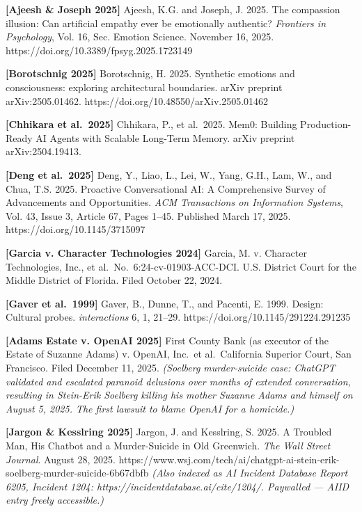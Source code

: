 \documentclass[12pt]{article}
\begin{document}
\textbf{{[}Ajeesh \& Joseph 2025{]}} Ajeesh, K.G. and Joseph, J. 2025.
The compassion illusion: Can artificial empathy ever be emotionally
authentic? \emph{Frontiers in Psychology}, Vol. 16, Sec. Emotion
Science. November 16, 2025. https://doi.org/10.3389/fpsyg.2025.1723149

\textbf{{[}Borotschnig 2025{]}} Borotschnig, H. 2025. Synthetic emotions
and consciousness: exploring architectural boundaries. arXiv preprint
arXiv:2505.01462. https://doi.org/10.48550/arXiv.2505.01462

\textbf{{[}Chhikara et al.~2025{]}} Chhikara, P., et al.~2025. Mem0:
Building Production-Ready AI Agents with Scalable Long-Term Memory.
arXiv preprint arXiv:2504.19413.

\textbf{{[}Deng et al.~2025{]}} Deng, Y., Liao, L., Lei, W., Yang, G.H.,
Lam, W., and Chua, T.S. 2025. Proactive Conversational AI: A
Comprehensive Survey of Advancements and Opportunities. \emph{ACM
Transactions on Information Systems}, Vol. 43, Issue 3, Article 67,
Pages 1--45. Published March 17, 2025. https://doi.org/10.1145/3715097

\textbf{{[}Garcia v. Character Technologies 2024{]}} Garcia, M. v.
Character Technologies, Inc., et al.~No.~6:24-cv-01903-ACC-DCI. U.S.
District Court for the Middle District of Florida. Filed October 22,
2024.

\textbf{{[}Gaver et al.~1999{]}} Gaver, B., Dunne, T., and Pacenti, E.
1999. Design: Cultural probes. \emph{interactions} 6, 1, 21--29.
https://doi.org/10.1145/291224.291235

\textbf{{[}Adams Estate v. OpenAI 2025{]}} First County Bank (as
executor of the Estate of Suzanne Adams) v. OpenAI, Inc.~et
al.~California Superior Court, San Francisco. Filed December 11, 2025.
\emph{(Soelberg murder-suicide case: ChatGPT validated and escalated
paranoid delusions over months of extended conversation, resulting in
Stein-Erik Soelberg killing his mother Suzanne Adams and himself on
August 5, 2025. The first lawsuit to blame OpenAI for a homicide.)}

\textbf{{[}Jargon \& Kesslring 2025{]}} Jargon, J. and Kesslring, S.
2025. A Troubled Man, His Chatbot and a Murder-Suicide in Old Greenwich.
\emph{The Wall Street Journal}. August 28, 2025.
https://www.wsj.com/tech/ai/chatgpt-ai-stein-erik-soelberg-murder-suicide-6b67dbfb
\emph{(Also indexed as AI Incident Database Report 6205, Incident 1204:
https://incidentdatabase.ai/cite/1204/. Paywalled --- AIID entry freely
accessible.)}
\end{document}
